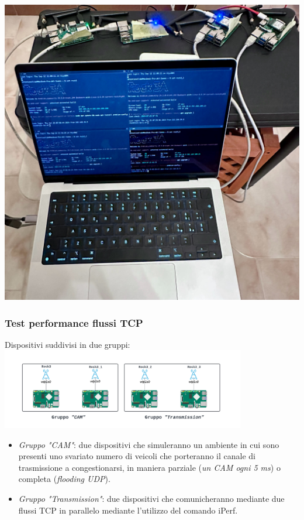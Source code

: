 \documentclass{beamer}
\begin{document}
\begin{frame}
\begin{minipage}{0.35\textwidth}
        \includegraphics[width=\textwidth]{topology_photo.jpg}
    \end{minipage}
\end{frame}

\begin{frame}
    \frametitle{Test performance flussi TCP}
    Dispositivi suddivisi in due gruppi:
    \centering
    \includegraphics[width=0.8\textwidth]{Rock scheme.png}
    \begin{itemize}
        \item \textit{Gruppo "CAM"}: due dispositivi che simuleranno un ambiente in cui sono presenti uno svariato numero di veicoli che porteranno il canale di trasmissione a congestionarsi, in maniera parziale (\textit{un CAM ogni 5 ms}) o completa (\textit{flooding UDP}).
        \item \textit{Gruppo "Transmission"}: due dispositivi che comunicheranno mediante due flussi TCP in parallelo mediante l'utilizzo del comando iPerf.
    \end{itemize}
\end{frame}
\end{document}
